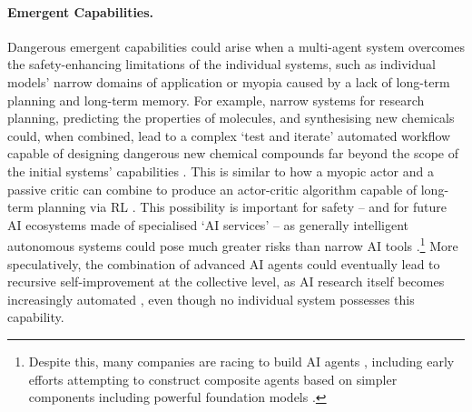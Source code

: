 \paragraph{Emergent Capabilities.}
Dangerous {emergent capabilities} could arise when a multi-agent system overcomes the safety-enhancing limitations of the individual systems, such as individual models' narrow domains of application or myopia caused by a lack of long-term planning and long-term memory.
For example, narrow systems for research planning, predicting the properties of molecules, and synthesising new chemicals could, when combined, lead to a complex `test and iterate' automated workflow capable of designing dangerous new chemical compounds far beyond the scope of the initial systems' capabilities \citep{boiko_emergent_2023,urbina_dual_2022,Luo2024}.
This is similar to how a myopic actor and a passive critic can combine to produce an actor-critic algorithm capable of long-term planning via RL \citep{konda1999actor}.
This possibility is important for safety -- and for future AI ecosystems made of specialised `AI services' \citep{Drexler2019} -- as generally intelligent autonomous systems could pose much greater risks than narrow AI tools \citep{Chan2023-aj}.\footnote{Despite this, many companies are racing to build AI agents \citep{OpenAI_agents,GDM_agents,Microsoft_agents,Meta_agents,Anthropic_agents}, including early efforts attempting to construct composite agents based on simpler components including powerful foundation models \citep[e.g.,][]{schick2023toolformer,wu2024autogen}.}
More speculatively, the combination of advanced AI agents could eventually lead to recursive self-improvement at the collective level, as AI research itself becomes increasingly automated \citep{Hutter2019,Mankowitz2023,Agnesina2023,Lu2024}, even though no individual system possesses this capability.

